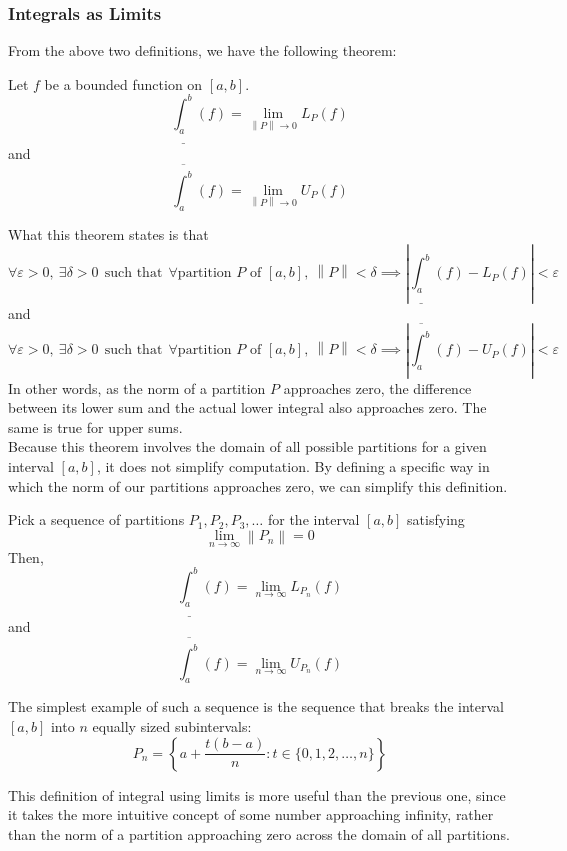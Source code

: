 \documentclass[10pt]{article}
\newenvironment{theorem}[1][]{\begin{tcolorbox}[colframe=_blue,colback=_blue2,title=Theorem. \ifthenelse{\isempty{#1}}{}{(#1)}
]}{\end{tcolorbox}}
\newcommand\norm[1]{\left\lVert#1\right\rVert}
\newcommand{\hr}{\par\noindent\makebox[\linewidth]{\rule{\textwidth}{0.4pt}}\par\vspace{0.1in}}
\newcommand{\emptyline}[0]{\\\hfill$~$\\}
\begin{document}
\subsubsection{Integrals as Limits}
From the above two definitions, we have the following theorem:
\begin{theorem}
    Let $f$ be a bounded function on $[a,b]$.
    $$
        \underline{\int_a^b}(f)=\lim_{\norm{P}\to 0} L_P(f)
    $$
    and
    $$
        \overline{\int_a^b}(f)=\lim_{\norm{P}\to 0} U_P(f)
    $$
\end{theorem}
What this theorem states is that
$$
    \forall \varepsilon>0,~\exists \delta>0~~\text{such that}~~\forall\text{partition $P$ of $[a,b]$},~\norm{P}<\delta\implies \left|\underline{\int_a^b}(f)-L_P(f)\right|<\varepsilon
$$
and
$$
    \forall \varepsilon>0,~\exists \delta>0~~\text{such that}~~\forall\text{partition $P$ of $[a,b]$},~\norm{P}<\delta\implies \left|\overline{\int_a^b}(f)-U_P(f)\right|<\varepsilon
$$
In other words, as the norm of a partition $P$ approaches zero, the difference between its lower sum and the actual lower integral also approaches zero. The same is true for upper sums.
\emptyline
Because this theorem involves the domain of all possible partitions for a given interval $[a,b]$, it does not simplify computation. By defining a specific way in which the norm of our partitions approaches zero, we can simplify this definition.
\begin{theorem}
    Pick a sequence of partitions $P_1,P_2,P_3,\dots$ for the interval $[a,b]$ satisfying
    $$
        \lim_{n\to\infty}\norm{P_n}=0
    $$
    Then,
    $$
        \underline{\int_a^b}(f)=\lim_{n\to\infty}L_{P_n}(f)
    $$
    and
    $$
        \overline{\int_a^b}(f)=\lim_{n\to\infty}U_{P_n}(f)
    $$
    \hr
    The simplest example of such a sequence is the sequence that breaks the interval $[a,b]$ into $n$ equally sized subintervals:
    $$
        P_n=\left\{a+\frac{t(b-a)}{n}:t\in\{0,1,2,\dots,n\}\right\}
    $$
\end{theorem}
This definition of integral using limits is more useful than the previous one, since it takes the more intuitive concept of some number approaching infinity, rather than the norm of a partition approaching zero across the domain of all partitions.
\end{document}
